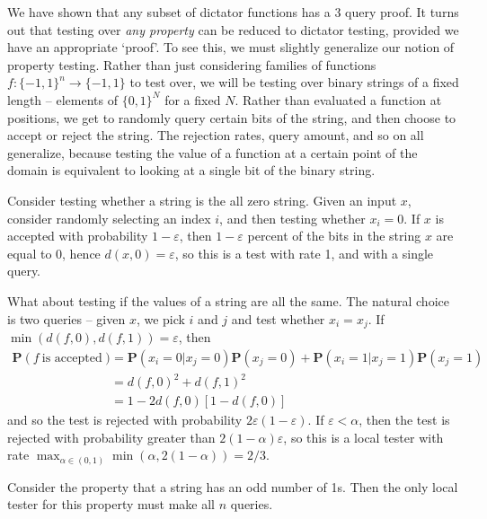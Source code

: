 We have shown that any subset of dictator functions has a 3 query proof. It turns out that testing over {\it any property} can be reduced to dictator testing, provided we have an appropriate `proof'. To see this, we must slightly generalize our notion of property testing. Rather than just considering families of functions $f: \{ -1, 1 \}^n \to \{ -1, 1 \}$ to test over, we will be testing over binary strings of a fixed length -- elements of $\{ 0, 1 \}^N$ for a fixed $N$. Rather than evaluated a function at positions, we get to randomly query certain bits of the string, and then choose to accept or reject the string. The rejection rates, query amount, and so on all generalize, because testing the value of a function at a certain point of the domain is equivalent to looking at a single bit of the binary string.

\begin{example}
    Consider testing whether a string is the all zero string. Given an input $x$, consider randomly selecting an index $i$, and then testing whether $x_i = 0$. If $x$ is accepted with probability $1 - \varepsilon$, then $1 - \varepsilon$ percent of the bits in the string $x$ are equal to $0$, hence $d(x,0) = \varepsilon$, so this is a test with rate 1, and with a single query.
\end{example}

\begin{example}
    What about testing if the values of a string are all the same. The natural choice is two queries -- given $x$, we pick $i$ and $j$ and test whether $x_i = x_j$. If $\min(d(f,0), d(f,1)) = \varepsilon$, then
    \begin{align*}
        \mathbf{P}(f\ \text{is accepted}) &= \mathbf{P}(x_i = 0 | x_j = 0) \mathbf{P}(x_j = 0) + \mathbf{P}(x_i = 1 | x_j = 1) \mathbf{P}(x_j = 1)\\
        &= d(f,0)^2 + d(f,1)^2\\
        &= 1 - 2d(f,0)[1 - d(f,0)]
    \end{align*}
    and so the test is rejected with probability $2\varepsilon(1 - \varepsilon)$. If $\varepsilon < \alpha$, then the test is rejected with probability greater than $2(1 - \alpha) \varepsilon$, so this is a local tester with rate $\max_{\alpha \in (0,1)} \min(\alpha, 2(1 - \alpha)) = 2/3$.
\end{example}

\begin{example}
    Consider the property that a string has an odd number of 1s. Then the only local tester for this property must make all $n$ queries.
\end{example}

